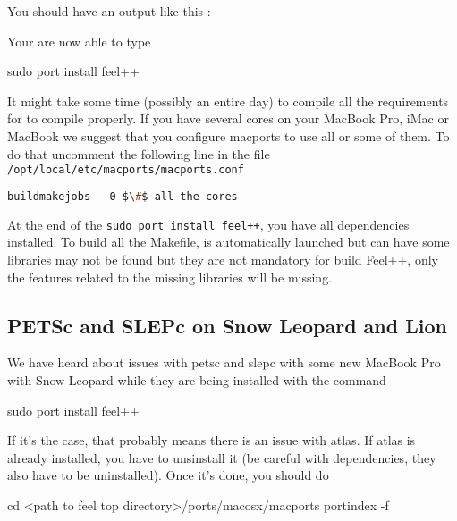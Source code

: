 You should have an output like this :
\begin{flushleft}
\end{flushleft}
Your are now able to type
\begin{unixcom}
		sudo port install feel++
\end{unixcom}
It might take some time (possibly an entire day) to compile all the requirements for \feel
to compile properly. If you have several cores on your MacBook Pro, iMac or MacBook
we suggest that you configure macports to use all or some of them.
To do that uncomment the following line in the file  \lstinline|/opt/local/etc/macports/macports.conf|
\begin{flushleft}
\begin{lstlisting}[language=sh]
buildmakejobs	0 $\#$ all the cores
\end{lstlisting}
\end{flushleft}
At the end of the \lstinline|sudo port install feel++|, you have all
dependencies installed. To build all the Makefile, \cmake is automatically
launched but can have some libraries may not be found but they are not mandatory
for build Feel++, only the features related to the missing libraries will be
missing.

\subsection{PETSc and SLEPc on Snow Leopard and Lion}
We have heard about issues with petsc and slepc with some new MacBook Pro with
Snow Leopard while they are being installed with the command
\begin{unixcom}
  sudo port install feel++
\end{unixcom}
If it's the case, that probably means there is an issue with
atlas. If atlas is already installed, you have to unsinstall it (be careful
with dependencies, they also have to be uninstalled). Once it's done, you should
do
\begin{unixcom}
		cd <path to feel top directory>/ports/macosx/macports
		portindex -f
\end{unixcom}

